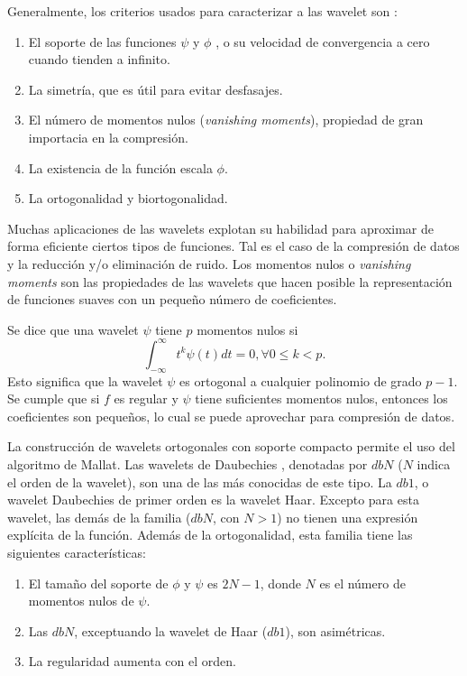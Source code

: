 Generalmente, los criterios usados para caracterizar a las wavelet son \cite{misiti2007wavelets}:
\begin{enumerate}
	\item El soporte de las funciones $\psi$ y $\phi$ , o su velocidad de convergencia a  cero cuando tienden a 
		infinito.
	\item La simetría, que es útil para evitar desfasajes.
	\item El número de momentos nulos (\textit{vanishing moments}), propiedad de gran importacia en la compresión.
	\item La existencia de la función escala $\phi$.
	\item La ortogonalidad y biortogonalidad.
\end{enumerate}

Muchas aplicaciones de las wavelets explotan su habilidad para aproximar de forma eficiente ciertos tipos de 
funciones. Tal es el caso de la compresión de datos y la reducción y/o eliminación de ruido.
Los momentos nulos o \textit{vanishing moments} son las propiedades de las wavelets que 
hacen posible la representación de funciones suaves con un pequeño número de coeficientes.

Se dice que una wavelet $\psi$ tiene $p$ momentos nulos si
\begin{equation}
	\int_{-\infty}^{\infty} t^k\psi(t)dt= 0 , \forall 0 \leq k < p.
\end{equation}
Esto significa que la wavelet $\psi$ es ortogonal a cualquier polinomio de grado $p-1$.
Se cumple que si $f$ es regular y $\psi$ tiene suficientes momentos nulos, entonces los coeficientes 
son pequeños, lo cual se puede aprovechar para compresión de datos.

La construcción de wavelets ortogonales con soporte compacto permite el uso del algoritmo de Mallat.
Las  wavelets de Daubechies \cite{daubechies1992}, denotadas por $dbN$ ($N$ indica el orden de la wavelet),
son una de las más conocidas de este tipo. La $db1$, o wavelet Daubechies de primer orden es la wavelet Haar.
Excepto para esta wavelet, las demás de la familia ($dbN$, con $N>1$) no tienen una expresión explícita de la 
función. Además de la ortogonalidad, esta familia tiene las siguientes características:

\begin{enumerate}
	\item El tamaño del soporte de $\phi$ y $\psi$ es $2N-1$, donde $N$ es el número de momentos nulos de $\psi$.
	\item Las $dbN$, exceptuando la wavelet de Haar ($db1$), son asimétricas.
	\item La regularidad aumenta con el orden.
\end{enumerate}

